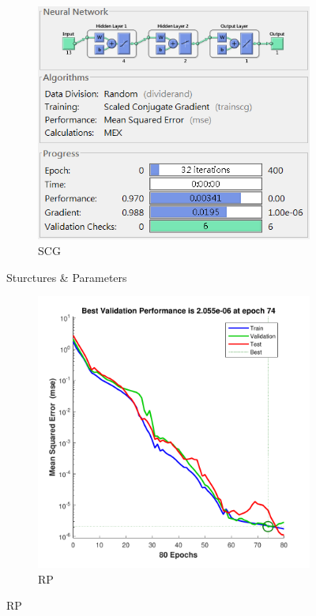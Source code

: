 \documentclass[12pt,a4paper]{article}
\begin{document}
\begin{CJK}{UTF8}{bsmi}
\begin{enumerate}
\begin{enumerate}
\begin{figure}[H]
\begin{subfigure}{.5\textwidth}
	 		\end{subfigure}%
	 		\begin{subfigure}{.5\textwidth}
	 			\centering
	 			\includegraphics[width=0.92\linewidth]{SCG2}
	 			\caption{SCG}
	 			
	 		\end{subfigure}
	 		\caption{Sturctures \& Parameters}
	 		
	 	\end{figure}
	 	
	 	
	 	\begin{figure}[H]
	 		\centering
	 		\begin{subfigure}{.5\textwidth}
	 			\centering
	 			\includegraphics[width=1\linewidth]{wine_rp_per}
	 			\caption{RP}
	 			

\end{subfigure}
\end{figure}
\end{enumerate}
\end{enumerate}
\end{CJK}
\end{document}
